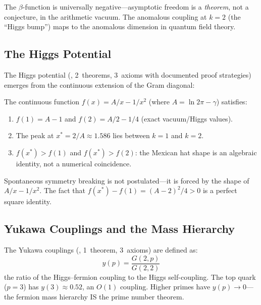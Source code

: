 The $\beta$-function is universally negative---asymptotic freedom
is a \emph{theorem}, not a conjecture, in the arithmetic vacuum.
The anomalous coupling at $k=2$ (the ``Higgs bump'') maps to
the anomalous dimension in quantum field theory.

\subsection{The Higgs Potential}
\label{sec:higgs-potential}

The Higgs potential (, 2~theorems,
3~axioms with documented proof strategies) emerges from the
continuous extension of the Gram diagonal:

\begin{theorem}
The continuous function $f(x) = A/x - 1/x^2$ (where $A = \ln 2\pi - \gamma$)
satisfies:
\begin{enumerate}
  \item $f(1) = A - 1$ and $f(2) = A/2 - 1/4$ (exact vacuum/Higgs values).
  \item The peak at $x^* = 2/A \approx 1.586$ lies between $k=1$ and $k=2$.
  \item $f(x^*) > f(1)$ and $f(x^*) > f(2)$: the Mexican hat shape
    is an algebraic identity, not a numerical coincidence.
\end{enumerate}
\end{theorem}

Spontaneous symmetry breaking is not postulated---it is forced by
the shape of $A/x - 1/x^2$. The fact that
$f(x^*) - f(1) = (A-2)^2/4 > 0$ is a perfect square identity.

\subsection{Yukawa Couplings and the Mass Hierarchy}
\label{sec:yukawa}

The Yukawa couplings (, 1~theorem,
3~axioms) are defined as:
\[
  y(p) = \frac{G(2,p)}{G(2,2)}
\]
the ratio of the Higgs--fermion coupling to the Higgs self-coupling.
The top quark ($p = 3$) has $y(3) \approx 0.52$, an $O(1)$ coupling.
Higher primes have $y(p) \to 0$---the fermion mass hierarchy IS the
prime number theorem.

